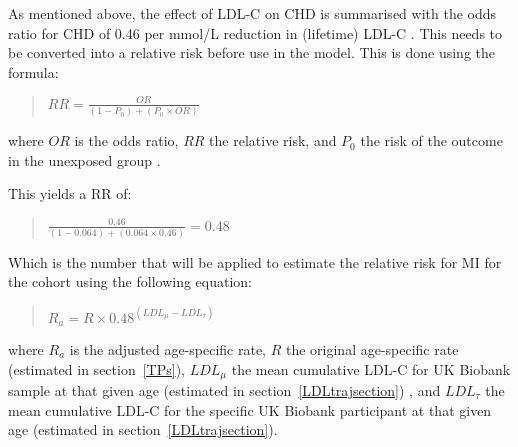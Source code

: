 \documentclass[11pt]{article}
\begin{document}
As mentioned above, the effect of LDL-C on CHD is summarised with the
odds ratio for CHD of 0.46 per mmol/L reduction in (lifetime) LDL-C \cite{FerenceJAMA2019}.
This needs to be converted into a relative risk before use in the model. 
This is done using the formula: 

\begin{quote}
\begin{math} 
RR = \frac{OR}{(1-P_0)+(P_0 \times OR)}
\end{math}
\end{quote}

where \begin{math} OR \end{math} is the odds ratio, 
\begin{math} RR \end{math} the relative risk, and 
\begin{math} P_0 \end{math} the risk of the outcome
in the unexposed group \cite{ZhangJAMA1998}. 

This yields a RR of:

\begin{quote}
\begin{math} 
\frac{0.46}{(1-0.064)+(0.064 \times 0.46)} = 0.48
\end{math}
\end{quote}

Which is the number that will be applied to estimate the relative risk for MI for the cohort using the following equation:

\begin{quote}
\begin{math} 
R_a = R \times 0.48^{(LDL_\mu-LDL_\tau)}
\end{math}
\end{quote}

where \begin{math} R_a \end{math} is the adjusted age-specific rate, 
\begin{math} R \end{math} the original age-specific rate (estimated in section~\ref{TPs}),
\begin{math} LDL_\mu \end{math} the mean cumulative LDL-C for UK Biobank 
sample at that given age (estimated in section~\ref{LDLtrajsection})
, and \begin{math} LDL_\tau \end{math} the mean cumulative LDL-C for 
the specific UK Biobank participant at that given age (estimated in section~\ref{LDLtrajsection}).
\end{document}
